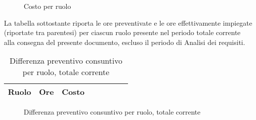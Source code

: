 \begin{figure}[H]
\begin{tikzpicture}

	

\end{tikzpicture}
\caption{Costo per ruolo}
\end{figure}

La tabella sottostante riporta le ore preventivate e le ore effettivamente impiegate (riportate tra parentesi) per ciascun ruolo presente nel periodo totale corrente alla consegna del presente documento, escluso il periodo di Analisi dei requisiti.

\begin{table}[H]
\centering
\begin{tabular}{lccccccc}
\toprule
    \textbf{Ruolo}  & \textbf{Ore} & \textbf{Costo} \\
    \midrule
    
    	
    
    \bottomrule
\end{tabular}
\caption{Differenza preventivo consuntivo per ruolo, totale corrente}
\end{table}

\begin{figure}[H]
\centering
{}
\caption{Differenza preventivo consuntivo per ruolo, totale corrente}
\end{figure}
